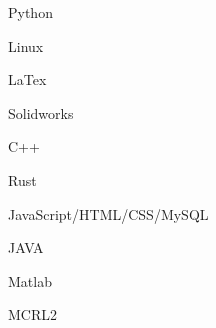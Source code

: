 \vspace{0.4cm}
\begin{cSection}{\textwidth}{0.47\textwidth}{0.48\textwidth}
{%
\begin{cSubsection}{}
  \begin{experienceItem} {}{Python}{}{} \end{experienceItem}
  \begin{experienceItem} {\hphantom{}}{Linux}{}{} \end{experienceItem}
  \begin{experienceItem} {\hphantom{}}{LaTex}{}{} \end{experienceItem}
  \begin{experienceItem} {\hphantom{}}{Solidworks}{}{} \end{experienceItem}

  \begin{experienceItem} {}{C++}{}{} \end{experienceItem}
  \begin{experienceItem} {\hphantom{}}{Rust}{}{} \end{experienceItem}
  \begin{experienceItem} {\hphantom{}}{JavaScript/HTML/CSS/MySQL}{}{} \end{experienceItem}
  \begin{experienceItem} {\hphantom{}}{JAVA}{}{} \end{experienceItem}
  \begin{experienceItem} {\hphantom{}}{Matlab}{}{} \end{experienceItem}
  \begin{experienceItem} {\hphantom{}}{MCRL2}{}{} \end{experienceItem}
\end{cSubsection}



}
\end{cSection}
